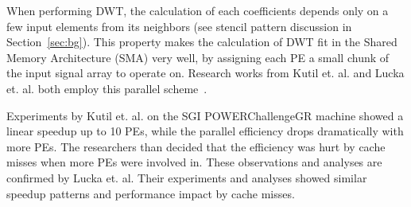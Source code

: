 When performing DWT, the calculation of each coefficients depends only 
on a few input elements from its neighbors (see stencil pattern 
discussion in Section~\ref{sec:bg}).
%
This property makes the calculation of DWT fit in the 
Shared Memory Architecture (SMA) very well, 
by assigning each PE a small chunk of the input signal array
to operate on.
%
Research works from Kutil et. al. and Lucka et. al. both employ
this parallel scheme~\cite{kutil1999hardware, lucka2000parallel}.

Experiments by Kutil et. al. on the SGI POWERChallengeGR machine showed 
a linear speedup up to 10 PEs, while the parallel efficiency drops 
dramatically with more PEs.
%
The researchers than decided that the efficiency was hurt by 
cache misses when more PEs were involved in.
%
These observations and analyses are confirmed by Lucka et. al.
%
Their experiments and analyses showed similar speedup patterns
and performance impact by cache misses.
